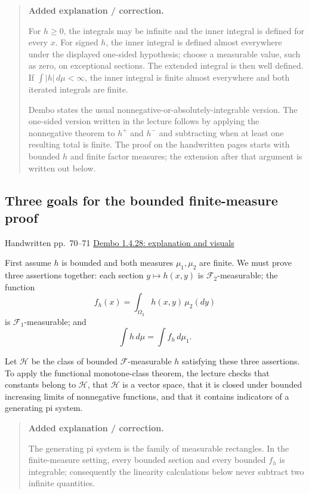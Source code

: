 \documentclass[11pt,letterpaper]{article}
\newcommand{\lecturesection}[1]{\subsection{#1}}
\begin{document}
\begin{quote}\small\textbf{Added explanation / correction.}

For $h\ge0$, the integrals may be infinite and the inner integral is defined for every $x$. For signed $h$, the inner integral is defined almost everywhere under the displayed one-sided hypothesis; choose a measurable value, such as zero, on exceptional sections. The extended integral is then well defined. If $\int|h|\,d\mu<\infty$, the inner integral is finite almost everywhere and both iterated integrals are finite.

Dembo states the usual nonnegative-or-absolutely-integrable version. The one-sided version written in the lecture follows by applying the nonnegative theorem to $h^+$ and $h^-$ and subtracting when at least one resulting total is finite. The proof on the handwritten pages starts with bounded $h$ and finite factor measures; the extension after that argument is written out below.
\end{quote}

\hypertarget{l8-s6}{}
\lecturesection{Three goals for the bounded finite-measure proof}
{\small\textcolor{lectureink}{Handwritten pp.\ 70--71} \quad \href{https://josephrbailey.com/probability/\#entry-1-4-28}{Dembo 1.4.28: explanation and visuals}}

First assume $h$ is bounded and both measures $\mu_1,\mu_2$ are finite. We must prove three assertions together: each section $y\mapsto h(x,y)$ is $\mathcal F_2$-measurable; the function \[f_h(x)=\int_{\Omega_2}h(x,y)\,\mu_2(dy)\] is $\mathcal F_1$-measurable; and \[\int h\,d\mu=\int f_h\,d\mu_1.\]

Let $\mathcal H$ be the class of bounded $\mathcal F$-measurable $h$ satisfying these three assertions. To apply the functional monotone-class theorem, the lecture checks that constants belong to $\mathcal H$, that $\mathcal H$ is a vector space, that it is closed under bounded increasing limits of nonnegative functions, and that it contains indicators of a generating pi system.

\begin{quote}\small\textbf{Added explanation / correction.}

The generating pi system is the family of measurable rectangles. In the finite-measure setting, every bounded section and every bounded $f_h$ is integrable; consequently the linearity calculations below never subtract two infinite quantities.
\end{quote}
\end{document}
